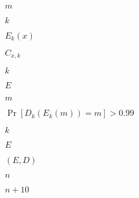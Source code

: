 \documentclass[10pt]{book}
\begin{document}
\begin{mdSnippets}
\begin{mdInlineSnippet}[6f8f57715090da2632453988d9a1501b]%
$m$\end{mdInlineSnippet}%
\begin{mdInlineSnippet}[8ce4b16b22b58894aa86c421e8759df3]%
$k$\end{mdInlineSnippet}%
\begin{mdInlineSnippet}%
$E_k(x)$\end{mdInlineSnippet}%
\begin{mdInlineSnippet}%
$C_{x,k}$\end{mdInlineSnippet}%
\begin{mdInlineSnippet}[8ce4b16b22b58894aa86c421e8759df3]%
$k$\end{mdInlineSnippet}%
\begin{mdInlineSnippet}%
$E$\end{mdInlineSnippet}%
\begin{mdInlineSnippet}[6f8f57715090da2632453988d9a1501b]%
$m$\end{mdInlineSnippet}%
\begin{mdInlineSnippet}%
$\Pr[D_k(E_k(m))=m]>0.99$\end{mdInlineSnippet}%
\begin{mdInlineSnippet}[8ce4b16b22b58894aa86c421e8759df3]%
$k$\end{mdInlineSnippet}%
\begin{mdInlineSnippet}%
$E$\end{mdInlineSnippet}%
\begin{mdInlineSnippet}[c150726dc018e82825c0c3617f46a1c9]%
$(E,D)$\end{mdInlineSnippet}%
\begin{mdInlineSnippet}[7b8b965ad4bca0e41ab51de7b31363a1]%
$n$\end{mdInlineSnippet}%
\begin{mdInlineSnippet}[17ac11907a6a56c8477262ee921991aa]%
$n+10$\end{mdInlineSnippet}%
\begin{mdInlineSnippet}%

\end{mdInlineSnippet}
\end{mdSnippets}
\end{document}
